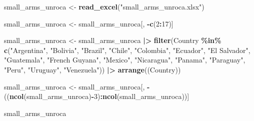 \documentclass[
  11pt,
]{article}
\newenvironment{Shaded}{\begin{snugshade}}{\end{snugshade}}
\newcommand{\DecValTok}[1]{\textcolor[rgb]{0.00,0.00,0.81}{#1}}
\newcommand{\FunctionTok}[1]{\textcolor[rgb]{0.13,0.29,0.53}{\textbf{#1}}}
\newcommand{\NormalTok}[1]{#1}
\newcommand{\OtherTok}[1]{\textcolor[rgb]{0.56,0.35,0.01}{#1}}
\newcommand{\SpecialCharTok}[1]{\textcolor[rgb]{0.81,0.36,0.00}{\textbf{#1}}}
\newcommand{\StringTok}[1]{\textcolor[rgb]{0.31,0.60,0.02}{#1}}
\begin{document}
\begin{Shaded}
\begin{Highlighting}[]
\NormalTok{small\_arms\_unroca }\OtherTok{\textless{}{-}} \FunctionTok{read\_excel}\NormalTok{(}\StringTok{"small\_arms\_unroca.xlsx"}\NormalTok{)}

\NormalTok{small\_arms\_unroca }\OtherTok{\textless{}{-}}\NormalTok{ small\_arms\_unroca[, }\SpecialCharTok{{-}}\FunctionTok{c}\NormalTok{(}\DecValTok{2}\SpecialCharTok{:}\DecValTok{17}\NormalTok{)]}

\NormalTok{small\_arms\_unroca }\OtherTok{\textless{}{-}}\NormalTok{ small\_arms\_unroca }\SpecialCharTok{|\textgreater{}}
\FunctionTok{filter}\NormalTok{(Country }\SpecialCharTok{\%in\%} \FunctionTok{c}\NormalTok{(}\StringTok{"Argentina"}\NormalTok{, }\StringTok{"Bolivia"}\NormalTok{, }\StringTok{"Brazil"}\NormalTok{, }\StringTok{"Chile"}\NormalTok{, }\StringTok{"Colombia"}\NormalTok{,}
\StringTok{"Ecuador"}\NormalTok{, }\StringTok{"El Salvador"}\NormalTok{, }\StringTok{"Guatemala"}\NormalTok{, }\StringTok{"French Guyana"}\NormalTok{, }\StringTok{"Mexico"}\NormalTok{, }\StringTok{"Nicaragua"}\NormalTok{,}
\StringTok{"Panama"}\NormalTok{, }\StringTok{"Paraguay"}\NormalTok{, }\StringTok{"Peru"}\NormalTok{, }\StringTok{"Uruguay"}\NormalTok{, }\StringTok{"Venezuela"}\NormalTok{)) }\SpecialCharTok{|\textgreater{}}
  \FunctionTok{arrange}\NormalTok{((Country))}

\NormalTok{small\_arms\_unroca }\OtherTok{\textless{}{-}}\NormalTok{ small\_arms\_unroca[, }\SpecialCharTok{{-}}\NormalTok{((}\FunctionTok{ncol}\NormalTok{(small\_arms\_unroca)}\SpecialCharTok{{-}}\DecValTok{3}\NormalTok{)}\SpecialCharTok{:}\FunctionTok{ncol}\NormalTok{(small\_arms\_unroca))]}

\NormalTok{small\_arms\_unroca}
\end{Highlighting}
\end{Shaded}
\end{document}
